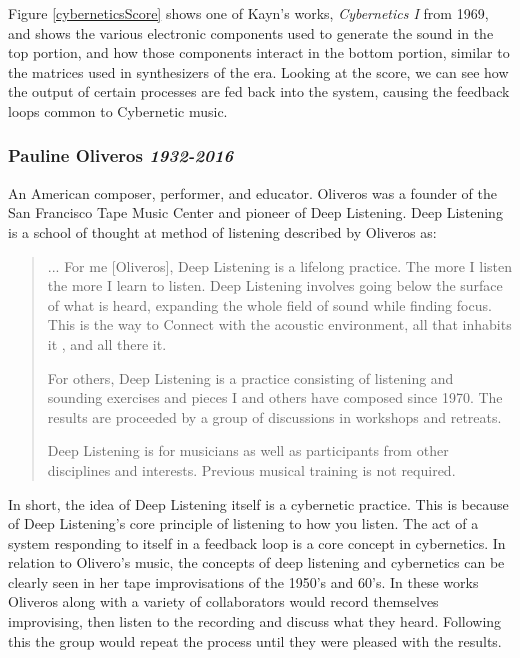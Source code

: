 Figure \ref{cyberneticsScore} shows one of Kayn's works, \textit{Cybernetics I} from 1969, and shows the various electronic components used to generate the sound in the top portion, and how those components interact in the bottom portion, similar to the matrices used in synthesizers of the era. Looking at the score, we can see how the output of certain processes are fed back into the system, causing the feedback loops common to Cybernetic music.


\subsubsection{Pauline Oliveros \textit{1932-2016}}
An American composer, performer, and educator. Oliveros was a founder of the San Francisco Tape Music Center and pioneer of Deep Listening\cite{HolmesElectronicMusic2020}. Deep Listening is a school of thought at method of listening described by Oliveros as:

\begin{quote}
    ... For me [Oliveros], Deep Listening is a lifelong practice. The more I listen the more I learn to listen. Deep Listening involves going below the surface of what is heard, expanding the whole field of sound while finding focus. This is the way to Connect with the acoustic environment, all that inhabits it , and all there it.

    For others, Deep Listening is a practice consisting of listening and sounding exercises and pieces I and others have composed since 1970. The results are proceeded by a group of discussions in workshops and retreats. 

    Deep Listening is for musicians as well as participants from other disciplines and interests. Previous musical training is not required\cite{cultureandHumanity2002}.
\end{quote}

In short, the idea of Deep Listening itself is a cybernetic practice\cite{gordosOliverosCybernetics}. This is because of Deep Listening's core principle of listening to how you listen. The act of a system responding to itself in a feedback loop is a core concept in cybernetics. In relation to Olivero's music, the concepts of deep listening and cybernetics can be clearly seen in her tape improvisations of the 1950's and 60's. In these works Oliveros along with a variety of collaborators would record themselves improvising, then listen to the recording and discuss what they heard. Following this the group would repeat the process until they were pleased with the results\cite{gordosOliverosCybernetics}. 

